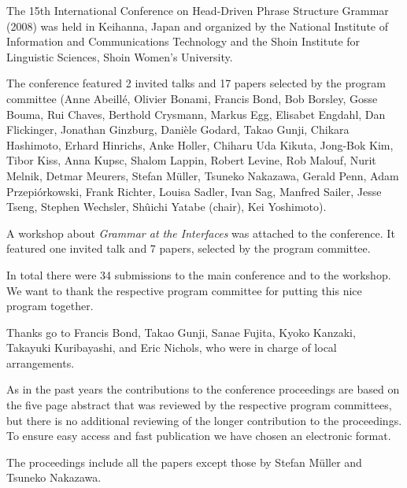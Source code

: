 The 15th International Conference on Head-Driven Phrase Structure Grammar (2008) was held in Keihanna, Japan
and organized by the National Institute of Information and Communications Technology and the Shoin Institute for Linguistic Sciences,
Shoin Women's University.

The conference featured 2 invited talks and 17 papers
selected by the program committee 
(Anne Abeillé,
Olivier Bonami,
Francis Bond,
Bob Borsley,
Gosse Bouma,
Rui Chaves,
Berthold Crysmann,
Markus Egg,
Elisabet Engdahl,
Dan Flickinger,
Jonathan Ginzburg,
Danièle Godard,
Takao Gunji,
Chikara Hashimoto,
Erhard Hinrichs,
Anke Holler,
Chiharu Uda Kikuta,
Jong-Bok Kim,
Tibor Kiss,
Anna Kupsc,
Shalom Lappin,
Robert Levine,
Rob Malouf,
Nurit Melnik,
Detmar Meurers,
Stefan Müller,
Tsuneko Nakazawa,
Gerald Penn,
Adam Przepiórkowski,
Frank Richter,
Louisa Sadler,
Ivan Sag,
Manfred Sailer,
Jesse Tseng,
Stephen Wechsler,
Sh{\^{u}}ichi Yatabe (chair),
Kei Yoshimoto).

A workshop about \emph{Grammar at the Interfaces}
was attached to the conference. It featured one invited talk and 7 papers, selected by the program committee.

In total there were 34 submissions to the main conference and to the
workshop. 
We want to thank the respective program committee for putting this nice program together.



Thanks go to Francis Bond, Takao Gunji, Sanae Fujita, Kyoko Kanzaki, Taka\-yuki Kuribayashi, and Eric
Nichols, who were in charge of local arrangements.


As in the past years the contributions to the conference proceedings are based on the five page abstract
that was reviewed by the respective program committees, but there is no additional reviewing of the
longer contribution to the proceedings.
To ensure easy access and fast publication we have chosen an electronic format.


The proceedings include all the papers except those by Stefan Müller and Tsuneko Nakazawa.

